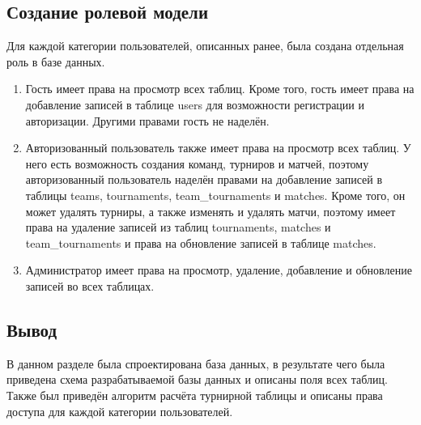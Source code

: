 \subsection{Создание ролевой модели}
Для каждой категории пользователей, описанных ранее, была создана отдельная роль в базе данных.
\begin{enumerate}
    \item Гость имеет права на просмотр всех таблиц. Кроме того, гость имеет права на добавление записей в таблице users для возможности регистрации и авторизации. Другими правами гость не наделён.
    \item Авторизованный пользователь также имеет права на просмотр всех таблиц. У него есть возможность создания команд, турниров и матчей, поэтому авторизованный пользователь наделён правами на добавление записей в таблицы teams, tournaments, team\_tournaments и matches. Кроме того, он может удалять турниры, а также изменять и удалять матчи, поэтому имеет права на удаление записей из таблиц tournaments, matches и team\_tournaments и права на обновление записей в таблице matches.
    \item Администратор имеет права на просмотр, удаление, добавление и обновление записей во всех таблицах.
\end{enumerate}

\subsection*{Вывод}
В данном разделе была спроектирована база данных, в результате чего была приведена схема разрабатываемой базы данных и описаны поля всех таблиц. Также был приведён алгоритм расчёта турнирной таблицы и описаны права доступа для каждой категории пользователей. 

